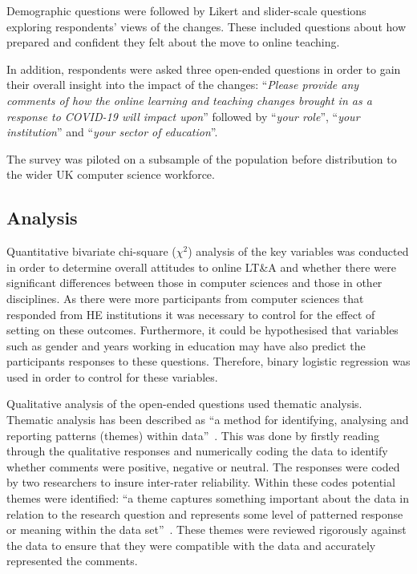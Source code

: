 \documentclass[sigconf]{acmart}
\begin{document}
Demographic questions were followed by Likert and slider-scale
questions exploring respondents' views of the changes. These included
questions about how prepared and confident they felt about the move to
online teaching.

In addition, respondents were asked three open-ended questions in
order to gain their overall insight into the impact of the changes:
``{\emph{Please provide any comments of how the online learning and
teaching changes brought in as a response to COVID-19 will impact
upon}}'' followed by ``{\emph{your role}}'', ``{\emph{your
institution}}'' and ``{\emph{your sector of education}}''.

The survey was piloted on a subsample of the population before
distribution to the wider UK computer science workforce.

\subsection{Analysis}

Quantitative bivariate chi-square ($\chi^2$) analysis of the key variables
was conducted in order to determine overall attitudes to online LT\&A
and whether there were significant differences between those in
computer sciences and those in other disciplines.  As there were more
participants from computer sciences that responded from HE
institutions it was necessary to control for the effect of setting on
these outcomes. Furthermore, it could be hypothesised that variables
such as gender and years working in education may have also predict
the participants responses to these questions. Therefore, binary
logistic regression was used in order to control for these variables.

Qualitative analysis of the open-ended questions used thematic
analysis. Thematic analysis has been described as ``a method for
identifying, analysing and reporting patterns (themes) within
data''~\cite[p.78]{braun+clarke:2006}. This was done by firstly reading
through the qualitative responses and numerically coding the data to
identify whether comments were positive, negative or neutral. The
responses were coded by two researchers to insure inter-rater
reliability. Within these codes potential themes were identified: ``a
theme captures something important about the data in relation to the
research question and represents some level of patterned response or
meaning within the data set''~\cite[p.82]{braun+clarke:2006}. These
themes were reviewed rigorously against the data to ensure that they
were compatible with the data and accurately represented the comments. 
\end{document}
